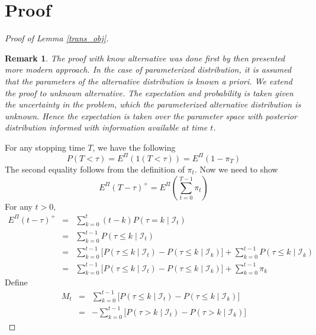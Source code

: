 \documentclass[preprint,authoryear,12pt,english]{elsarticle}
\theoremstyle{plain}
\newtheorem*{remark}{Remark}
\begin{document}
\section{Proof}
\begin{proof}[Proof of Lemma \ref{trans_obj}]
    \begin{remark}
        The proof with know alternative was done first by \cite{Shiryaev1963} then \cite{Poor2009QuickestDetection} presented more modern approach. In the case of parameterized distribution, it is assumed that the parameters of the alternative distribution is known a priori. We extend the proof to unknown alternative. The expectation and probability is taken given the uncertainty in the problem, which the parameterized alternative distribution is unknown. Hence the expectation is taken over the parameter space with posterior distribution informed with information available at time $t$.
    \end{remark}
    For any stopping time $T$, we have the following
    \begin{equation}
        P(T<\tau) = E^{\Pi}(1(T<\tau)) = E^{\Pi}(1-\pi_{T})
    \end{equation}
    The second equality follows from the definition of $\pi_{t}$.
    Now we need to show
    \begin{equation}
        E^{\Pi}\left(T-\tau\right)^{+} = E^{\Pi}\left(\sum_{t=0}^{T-1}\pi_{t}\right)
    \end{equation}
    For any $t>0$,
    \begin{eqnarray*}
        E^{\Pi}\left(t-\tau \right)^{+} &=& \sum_{k=0}^{t}(t-k)P(\tau=k \mid \mathcal{I}_{t})\\
        &=& \sum_{k=0}^{t-1} P(\tau \leq k \mid \mathcal{I}_{t})\\
        &=& \sum_{k=0}^{t-1} \lbrack P(\tau \leq k \mid \mathcal{I}_{t})-P(\tau \leq k \mid \mathcal{I}_{k}) \rbrack +\sum_{k=0}^{t-1}P(\tau \leq k \mid \mathcal{I}_{k})\\
        &=& \sum_{k=0}^{t-1} \lbrack P(\tau \leq k\mid\mathcal{I}_{t})-P(\tau \leq k\mid\mathcal{I}_{k}) \rbrack +\sum_{k=0}^{t-1}\pi_{k}
    \end{eqnarray*}
    Define
    \begin{eqnarray*}
        M_{t} &=& \sum_{k=0}^{t-1} \lbrack P(\tau \leq k \mid \mathcal{I}_{t})-P(\tau \leq k \mid \mathcal{I}_{k}) \rbrack\\
        &=& -\sum_{k=0}^{t-1}\lbrack P(\tau > k \mid \mathcal{I}_{t}) - P(\tau > k \mid \mathcal{I}_{k})\rbrack
    \end{eqnarray*}

\end{proof}
\end{document}
